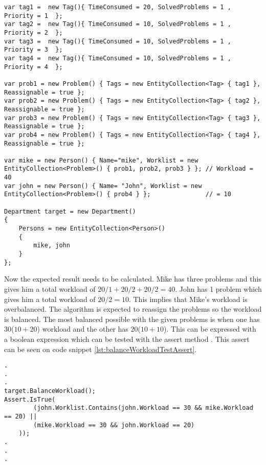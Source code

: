 \begin{lstlisting}[style=sourceCode, caption=\myCaption{The arrange phase of the unit test of balance workload}, label=lst:balanceWorkloadTest2arrange]
var tag1 =  new Tag(){ TimeConsumed = 20, SolvedProblems = 1 , Priority = 1  };  
var tag2 =  new Tag(){ TimeConsumed = 10, SolvedProblems = 1 , Priority = 2  }; 
var tag3 =  new Tag(){ TimeConsumed = 10, SolvedProblems = 1 , Priority = 3  }; 
var tag4 =  new Tag(){ TimeConsumed = 10, SolvedProblems = 1 , Priority = 4  }; 

var prob1 = new Problem() { Tags = new EntityCollection<Tag> { tag1 }, Reassignable = true };
var prob2 = new Problem() { Tags = new EntityCollection<Tag> { tag2 }, Reassignable = true };
var prob3 = new Problem() { Tags = new EntityCollection<Tag> { tag3 }, Reassignable = true };
var prob4 = new Problem() { Tags = new EntityCollection<Tag> { tag4 }, Reassignable = true };
   
var mike = new Person() { Name="mike", Worklist = new EntityCollection<Problem>() { prob1, prob2, prob3 } }; // Workload = 40
var john = new Person() { Name= "John", Worklist = new EntityCollection<Problem>() { prob4 } };               // = 10

Department target = new Department()
{
    Persons = new EntityCollection<Person>()
    {
        mike, john
    }
};
\end{lstlisting}

Now the expected result needs to be calculated. 
Mike has three problems and this gives him a total workload of $20/1 + 20/2 + 20/2 = 40$. 
John has 1 problem which gives him a total workload of $20 / 2 = 10$. 
This implies that Mike's workload is overbalanced. 
The algorithm is expected to reassign the problems so the workload is balanced. 
The most balanced possible with the given problems is when one has 30($10 + 20$) workload and the other has 20($10 + 10$). 
This can be expressed with a boolean expression which can be tested with the assert method . 
This assert can be seen on code snippet \ref{lst:balanceWorkloadTestAssert}.

\begin{lstlisting}[style=sourceCode, caption=\myCaption{An example unit test which tests a specific instance of the balanceWorkload method}, label=lst:balanceWorkloadTestAssert]
.
.
.
target.BalanceWorkload();
Assert.IsTrue(
		(john.Worklist.Contains(john.Workload == 30 && mike.Workload == 20) || 
		(mike.Workload == 30 && john.Workload == 20)
	));
.
.
.
\end{lstlisting}

